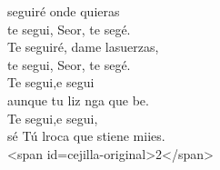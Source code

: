 \begin{cancion}[Te seguiré][Ixcís]%
	seguiré onde quieras\\
	te segui, Seor, te segé. \\
	Te seguiré, dame lasuerzas,\\
	te segui, Seor, te segé. \\
\jump
	Te segui,e segui \\
	aunque tu liz nga que be. \\
	Te segui,e segui, \\
	sé Tú lroca que stiene miies.\\
<span id=cejilla-original>2</span>\\
\end{cancion}%
